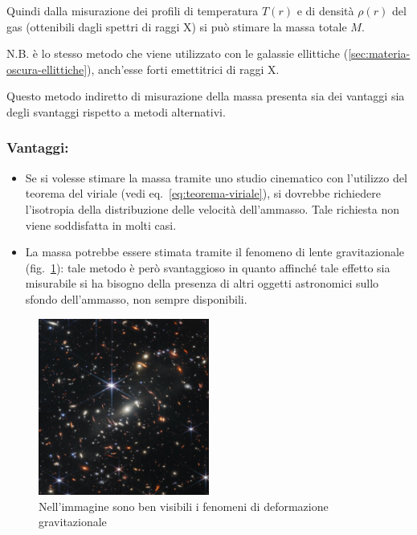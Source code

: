Quindi dalla misurazione dei profili di temperatura $T(r)$ e di densità $\rho(r)$ del gas (ottenibili dagli spettri di raggi X) si può stimare la massa totale $M$. 

\noindent N.B. è lo stesso metodo che viene utilizzato con le galassie ellittiche (\ref{sec:materia-oscura-ellittiche}), anch’esse forti emettitrici di raggi X.

Questo metodo indiretto di misurazione della massa presenta sia dei vantaggi sia degli svantaggi rispetto a metodi alternativi.

\subsubsection{\textbf{Vantaggi:}} 
\begin{itemize}
    \item Se si volesse stimare la massa tramite uno studio cinematico con l'utilizzo del teorema del viriale (vedi eq.~\ref{eq:teorema-viriale}), si dovrebbe richiedere l'isotropia della distribuzione delle velocità dell'ammasso. Tale richiesta non viene soddisfatta in molti casi. 
    \item La massa potrebbe essere stimata tramite il fenomeno di lente gravitazionale (fig.~\ref{fig:lensing}): tale metodo è però svantaggioso in quanto affinché tale effetto sia misurabile si ha bisogno della presenza di altri oggetti astronomici sullo sfondo dell’ammasso, non sempre disponibili.
\end{itemize} 

\begin{figure}
    \centering
    \includegraphics[width = 0.5\textwidth]{immagini/lensing.png}
    \caption{Nell'immagine sono ben visibili i fenomeni di deformazione gravitazionale}
    \label{fig:lensing}
\end{figure}

